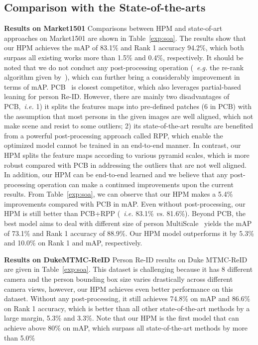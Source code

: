 \documentclass[letterpaper]{article} \usepackage{aaai19}  \usepackage{times}  \usepackage{helvet}  \usepackage{courier}  \usepackage{url}  \usepackage{graphicx}  \frenchspacing  \setlength{\pdfpagewidth}{8.5in}  \setlength{\pdfpageheight}{11in}  \usepackage{multirow}
\newcommand{\eg}{\emph{e.g. }}
\newcommand{\ie}{\emph{i.e. }}
\begin{document}
\subsection{Comparison with the State-of-the-arts}
{\bf Results on Market1501} Comparisons between HPM and state-of-art approaches on Market1501 are shown in Table~\ref{exp:soa}. The results show that our HPM achieves the mAP of 83.1\% and Rank 1 accuracy 94.2\%, which both surpass all existing works more than 1.5\% and 0.4\%, respectively. It should be noted that we do not conduct any post-processing operation (~\eg the re-rank algorithm given by~\cite{zhong2017re}), which can further bring a considerably improvement in terms of mAP. PCB~\cite{sun2017beyond} is closest competitor, which also leverages partial-based leaning for person Re-ID. However, there are mainly two disadvantages of PCB,~\ie 1) it splits the features maps into pre-defined patches (6 in PCB) with the assumption that most persons in the given images are well aligned, which not make scene and resist to some outliers; 2) its state-of-the-art results are benefited from a powerful post-processing approach called RPP, which enable the optimized model cannot be trained in an end-to-end manner. In contrast, our HPM splits the feature maps according to various pyramid scales, which is more robust compared with PCB in addressing the outliers that are not well aligned. In addition, our HPM can be end-to-end learned and we believe that any post-processing operation can make a continued improvements upon the current results. From Table~\ref{exp:soa}, we can observe that our HPM makes a 5.4\% improvements compared with PCB in mAP. Even without post-processing, our HPM is still better than PCB+RPP (~\ie 83.1\% \emph{vs.} 81.6\%). Beyond PCB, the best model aims to deal with different size of person MultiScale~\cite{chen2017multi} yields the mAP of 73.1\% and Rank 1 accuracy of 88.9\%. Our HPM model outperforms it by 5.3\% and 10.0\% on Rank 1 and mAP, respectively.

{\bf Results on DukeMTMC-ReID} Person Re-ID results on Duke MTMC-ReID are given in Table~\ref{exp:soa}. This dataset is challenging because it has 8 different camera and the person bounding box size varies drastically across different camera views, however, our HPM achieves even better performance on this dataset. Without any post-processing, it still achieves 74.8\% on mAP and 86.6\% on Rank 1 accuracy, which is better than all other state-of-the-art methods by a large margin, 5.3\% and 3.3\%. Note that our HPM is the first model that can achieve above 80\% on mAP, which surpass all state-of-the-art methods by more than 5.0\%
\end{document}
